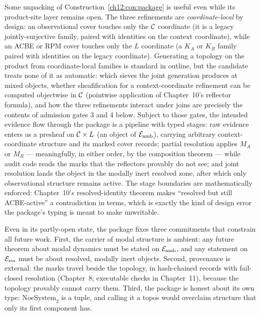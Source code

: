 \begin{remark}
\label{ch12:rem:flow}
Some unpacking of Construction~\ref{ch12:con:package} is useful even
while its product-site layer remains open. The three refinements are
\emph{coordinate-local} by design: an observational cover touches only
the $\mathcal{C}$ coordinate (it is a legacy jointly-surjective family, paired
with identities on the context coordinate), while an ACBE or RPM cover
touches only the $L$ coordinate (a $K_A$ or $K_R$ family paired with
identities on the legacy coordinate). Generating a topology on the
product from coordinate-local families is standard in outline, but the
candidate treats none of it as automatic: which sieves the joint
generation produces at mixed objects, whether sheafification for a
context-coordinate refinement can be computed objectwise in $\mathcal{C}$
(pointwise application of Chapter~10's reflector formula), and how the
three refinements interact under joins are precisely the contents of
admission gates 3 and 4 below. Subject to those gates, the intended
evidence flow through the package is a pipeline with typed stages: raw
evidence enters as a presheaf on $\mathcal{C} \times L$ (an object of $\mathcal{E}_{\mathrm{amb}}$),
carrying arbitrary context-coordinate structure and its marked cover
records; partial resolution applies $M_A$ or $M_R$ --- meaningfully, in
either order, by the composition theorem --- while audit code reads the
marks that the reflectors provably do not see; and joint resolution
lands the object in the modally inert resolved zone, after which only
observational structure remains active. The stage boundaries are
mathematically enforced: Chapter~10's resolved-identity theorem makes
``resolved but still ACBE-active'' a contradiction in terms, which is
exactly the kind of design error the package's typing is meant to make
unwritable.
\end{remark}

\begin{remark}
\label{ch12:rem:buys}
Even in its partly-open state, the package fixes three commitments that
constrain all future work. First, the carrier of modal structure is ambient:
any future theorem about modal dynamics must be stated on $\mathcal{E}_{\mathrm{amb}}$, and any
statement on $\mathcal{E}_{\mathrm{res}}$ must be about resolved, modally inert objects. Second,
provenance is external: the marks travel beside the topology, in
hash-chained records with fail-closed resolution (Chapter~8; executable
checks in Chapter~11), because the
topology provably cannot carry them. Third, the package is honest about its
own type: $\mathrm{NoeSystem}_2$ is a tuple, and calling it a topos would
overclaim structure that only its first component has.
\end{remark}


